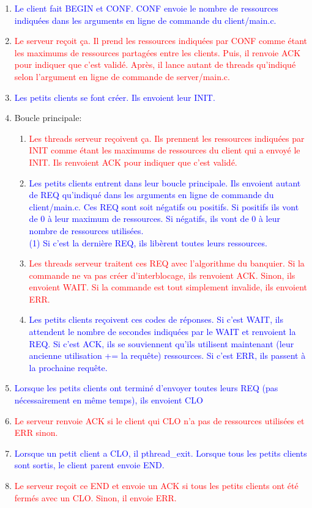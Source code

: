 \documentclass[11pt]{article}
\begin{document}
\begin{enumerate}[label=\alph*.]
 \item \textcolor{blue}{Le client fait BEGIN et CONF. CONF envoie le nombre de ressources indiquées dans les arguments en ligne de commande du client/main.c.}
 \item \textcolor{red}{Le serveur reçoit ça. Il prend les ressources indiquées par CONF comme étant les maximums de ressources partagées entre les clients. 
 Puis, il renvoie ACK pour indiquer que c’est validé. Après, il lance autant de threads qu’indiqué selon l’argument en ligne de commande de server/main.c.}
 \item \textcolor{blue}{Les petits clients se font créer. Ils envoient leur INIT.}
 \item Boucle principale:
  \begin{enumerate}[label =\roman*.]
   \item \textcolor{red}{Les threads serveur reçoivent ça. Ils prennent les ressources indiquées par INIT comme étant les maximums de ressources du client qui a envoyé le INIT. Ils renvoient ACK pour indiquer que c’est validé.}
   \item \textcolor{blue}{Les petits clients entrent dans leur boucle principale. Ils envoient autant de REQ qu’indiqué dans les arguments en ligne de commande du client/main.c. Ces REQ sont soit négatifs ou positifs. Si positifs ils vont de 0 à leur maximum de ressources. Si négatifs, ils vont de 0 à leur nombre de ressources utilisées.
   \\(1) Si c'est la dernière REQ, ils libèrent toutes leurs ressources.}
   \item \textcolor{red}{Les threads serveur traitent ces REQ avec l’algorithme du banquier. Si la commande ne va pas créer d’interblocage, ils renvoient ACK. Sinon, ils envoient WAIT. Si la commande est tout simplement invalide, ils envoient ERR. }
   \item \textcolor{blue}{Les petits clients reçoivent ces codes de réponses. Si c’est WAIT, ils attendent le nombre de secondes indiquées par le WAIT et renvoient la REQ. Si c’est ACK, ils se souviennent qu’ils utilisent maintenant (leur ancienne utilisation += la requête) ressources. Si c’est ERR, ils passent à la prochaine requête.}
  \end{enumerate}
 \item \textcolor{blue}{Lorsque les petits clients ont terminé d’envoyer toutes leurs REQ (pas nécessairement en même temps), ils envoient CLO}
 \item \textcolor{red}{Le serveur renvoie ACK si le client qui CLO n’a pas de ressources utilisées et ERR sinon.}
 \item \textcolor{blue}{Lorsque un petit client a CLO, il pthread\_exit. Lorsque tous les petits clients sont sortis, le client parent envoie END.}
 \item \textcolor{red}{Le serveur reçoit ce END et envoie un ACK si tous les petits clients ont été fermés avec un CLO. Sinon, il envoie ERR.}\\\\
 \end{enumerate}
\end{document}
